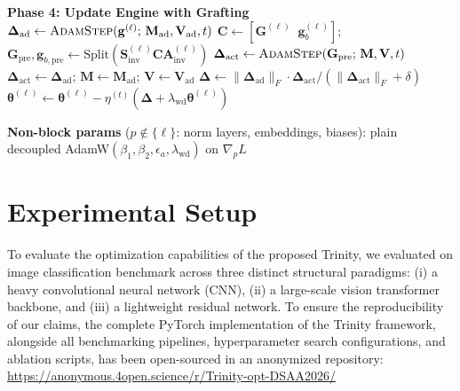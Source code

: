 \documentclass[conference]{IEEEtran}
\begin{document}
\begin{algorithm*}[!t]
\begin{algorithmic}[1]
    \Statex \textbf{Phase 4: Update Engine with Grafting}
        \State $\boldsymbol{\Delta}_{\mathrm{ad}} \leftarrow \textsc{AdamStep}(\mathbf{g}^{(\ell)};\, \mathbf{M}_{\mathrm{ad}}, \mathbf{V}_{\mathrm{ad}}, t)$ 
            \State $\mathbf{C} \leftarrow [\mathbf{G}^{(\ell)} \;\; \mathbf{g}_b^{(\ell)}]$; $\mathbf{G}_{\mathrm{pre}}, \mathbf{g}_{b,\mathrm{pre}} \leftarrow \mathrm{Split}(\mathbf{S}_{\mathrm{inv}}^{(\ell)} \mathbf{C} \mathbf{A}_{\mathrm{inv}}^{(\ell)})$
            \State $\boldsymbol{\Delta}_{\mathrm{act}} \leftarrow \textsc{AdamStep}(\mathbf{G}_{\mathrm{pre}};\, \mathbf{M}, \mathbf{V}, t)$ 
        \Else
            \State $\boldsymbol{\Delta}_{\mathrm{act}} \leftarrow \boldsymbol{\Delta}_{\mathrm{ad}}$; $\mathbf{M} \leftarrow \mathbf{M}_{\mathrm{ad}}$; $\mathbf{V} \leftarrow \mathbf{V}_{\mathrm{ad}}$
        \EndIf
        \State $\boldsymbol{\Delta} \leftarrow \|\boldsymbol{\Delta}_{\mathrm{ad}}\|_F \cdot \boldsymbol{\Delta}_{\mathrm{act}} / (\|\boldsymbol{\Delta}_{\mathrm{act}}\|_F + \delta)$ 
        \State $\boldsymbol{\theta}^{(\ell)} \leftarrow \boldsymbol{\theta}^{(\ell)} - \eta^{(t)}(\boldsymbol{\Delta} + \lambda_{\mathrm{wd}}\boldsymbol{\theta}^{(\ell)})$
    \EndFor

    \State \textbf{Non-block params} ($p \notin \{\ell\}$: norm layers, embeddings, biases): plain decoupled AdamW$(\beta_1,\beta_2,\epsilon_a,\lambda_{\mathrm{wd}})$ on $\nabla_p L$
\EndWhile
\end{algorithmic}
\end{algorithm*}

\section{Experimental Setup}
\label{sec:experimental_setup}

To evaluate the optimization capabilities of the proposed Trinity, we evaluated on image classification benchmark across three distinct structural paradigms: (i) a heavy
convolutional neural network (CNN), (ii) a large-scale vision transformer backbone, and (iii) a lightweight residual network.
To ensure the reproducibility of our claims, the complete PyTorch implementation of the Trinity framework, alongside all benchmarking pipelines, hyperparameter search configurations, and ablation scripts, has been open-sourced in an anonymized repository: \url{https://anonymous.4open.science/r/Trinity-opt-DSAA2026/}
\end{document}
